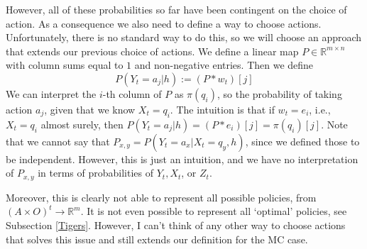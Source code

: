 \documentclass{article}
\theoremstyle{definition}
\begin{document}
However, all of these probabilities so far have been contingent on the choice of action. As a consequence we also need to define a way to choose actions. 
Unfortunately, there is no standard way to do this, so we will choose an approach that extends our previous choice of actions. We define a linear map $P\in \mathbb{R}^{m \times n}$ with column sums equal to $1$ and non-negative entries. Then we define
\[
P(Y_t=a_j|h):=(P*w_t)[j]
\]
We can interpret the $i$-th column of $P$ as $\pi(q_i)$, so the probability of taking action $a_j$, given that we know $X_t=q_i$. The intuition is that if $w_t=e_i$, i.e., $X_t=q_i$ almost surely, then $P(Y_t=a_j|h)=(P*e_i)[j]=\pi(q_i)[j]$. Note that we cannot say that $P_{x,y}=P(Y_t=a_x|X_t=q_y,h)$, since we defined those to be independent. However, this is just an intuition, and we have no interpretation of $P_{x,y}$ in terms of probabilities of $Y_t,X_t$, or $Z_t$.

Moreover, this is clearly not able to represent all possible policies, from $(A \times O)^t\rightarrow \mathbb{R}^m$. It is not even possible to represent all `optimal' policies, see Subsection \ref{Tigers}. However, I can't think of any other way to choose actions that solves this issue and still extends our definition for the MC case.
\end{document}
